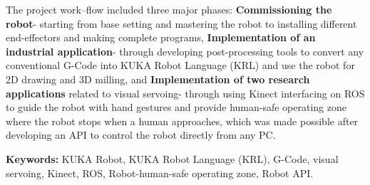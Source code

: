 The project work--flow included three major phases: \textbf{Commissioning the robot}- starting from base setting and mastering the robot to installing different end-effectors and making complete programs,  \textbf{Implementation of an industrial application}- through developing post-processing tools to convert any conventional G-Code into KUKA Robot Language (KRL) and use the robot for 2D drawing and 3D milling, and \textbf{ Implementation of two research applications} related to visual servoing- through using Kinect interfacing on ROS to guide the robot with hand gestures and provide human-safe operating zone where the robot stops when a human approaches, which was made possible after developing an API to control the robot directly from any PC.

\vspace{2cm}
\noindent\textbf{Keywords:} KUKA Robot, KUKA Robot Language (KRL), G-Code, visual servoing, Kinect, ROS, Robot-human-safe operating zone, Robot API.
 
 
